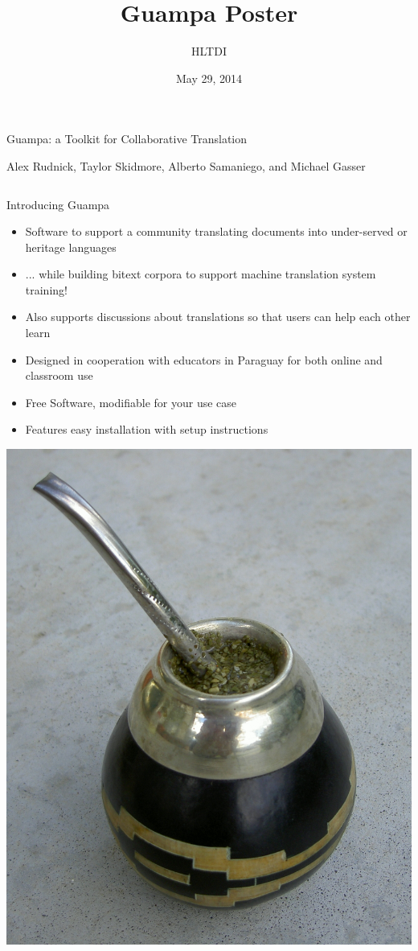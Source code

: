 \documentclass[final]{beamer}
\title{Guampa Poster}
\author{HLTDI}
\institute[Indiana University]{School of Informatics and Computing, Indiana University}
\date{May 29, 2014}
\begin{document}
\begin{frame}{} 
  \begin{block}
    {\centering \Huge Guampa: a Toolkit for Collaborative Translation}\par
    \centering
    {\large Alex Rudnick, Taylor Skidmore, Alberto Samaniego, and Michael Gasser} \\
    \par
  \end{block}

\begin{columns}[t]

  \begin{column}{.32\linewidth}

  \vfill
  \begin{block}{\large Introducing Guampa}
    \centering
    \begin{itemize}
    \item Software to support a community translating documents into
    under-served or heritage languages
    \item ... while building bitext corpora to support machine translation
    system training!
    \item Also supports discussions about translations so that users can help
    each other learn
    \item Designed in cooperation with educators in Paraguay for both online
    and classroom use
    \item Free Software, modifiable for your use case
    \item Features easy installation with setup instructions
    \end{itemize}
  \end{block}

  \centering
  \includegraphics[width=.5\linewidth]{guampa_mate.jpg}


\end{column}
\end{columns}
\end{frame}
\end{document}
